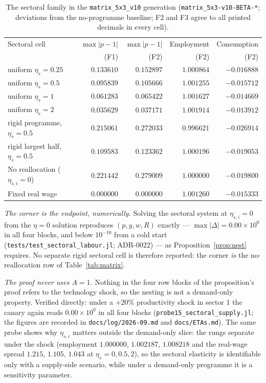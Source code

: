 \begin{table}[htbp]
\centering
\caption{The sectoral family in the \texttt{matrix\_5x3\_v10} generation
(\texttt{matrix\_5x3-v10-BETA-*}; deviations from the no-programme baseline;
F2 and F3 agree to all printed decimals in every cell).}
\label{tab:sectoral}
\begin{tabular}{lrrrr}
\toprule
Sectoral cell & $\max|p-1|$ & $\max|p-1|$ & Employment & Consumption \\
 & (F1) & (F2) & (F2) & (F2) \\
\midrule
uniform $\eta_s = 0.25$ & $0.133610$ & $0.152897$ & $1.000864$ & $-0.016888$ \\
uniform $\eta_s = 0.5$  & $0.095839$ & $0.105666$ & $1.001255$ & $-0.015712$ \\
uniform $\eta_s = 1$    & $0.061283$ & $0.065422$ & $1.001627$ & $-0.014669$ \\
uniform $\eta_s = 2$    & $0.035629$ & $0.037171$ & $1.001914$ & $-0.013912$ \\
\midrule
rigid programme, $\eta_s = 0.5$ & $0.215061$ & $0.272033$ & $0.996621$ & $-0.026914$ \\
rigid largest half, $\eta_s = 0.5$ & $0.109583$ & $0.123362$ & $1.000196$ & $-0.019053$ \\
\midrule
No reallocation ($\eta_{s,i} = 0$) & $0.221442$ & $0.279009$ & $1.000000$ & $-0.019800$ \\
Fixed real wage & $0.000000$ & $0.000000$ & $1.001260$ & $-0.015333$ \\
\bottomrule
\end{tabular}
\end{table}

\emph{The corner is the endpoint, numerically.} Solving the sectoral system at
$\eta_{s,i} = 0$ from the $\eta = 0$ solution reproduces $(p, y, w, R)$ exactly
--- $\max|\Delta| = 0.00 \times 10^0$ in all four blocks, and below $10^{-10}$
from a cold start (\texttt{tests/test\_sectoral\_labour.jl};
ADR-0022) --- as Proposition~\ref{prop:nest} requires. No separate
rigid sectoral cell is therefore reported: the corner \emph{is} the
no-reallocation row of
Table~\ref{tab:matrix}.

\emph{The proof never uses $A = 1$.} Nothing in the four row blocks of the
proposition's proof refers to the technology shock, so the nesting is not a
demand-only property. Verified directly: under a $+20\%$ productivity shock in
sector 1 the canary again reads $0.00 \times 10^0$ in all four blocks
(\texttt{probe15\_sectoral\_supply.jl}; the figures are
recorded in \texttt{docs/log/2026-09.md} and \texttt{docs/ETAs.md}). The same probe shows why $\eta_{s,i}$
matters outside the demand-only slice: the rungs separate under the shock
(employment $1.000000$, $1.002187$, $1.008218$ and the real-wage spread
$1.215$, $1.105$, $1.043$ at $\eta_s = 0, 0.5, 2$), so the sectoral elasticity
is identifiable only with a supply-side scenario, while under a demand-only
programme it is a sensitivity parameter.


